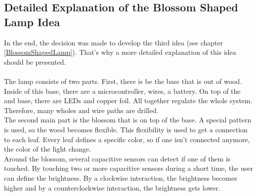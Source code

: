 \documentclass[04_projectProcess.tex]{subfiles}
\begin{document}
    \subsection{Detailed Explanation of the Blossom Shaped Lamp Idea}
        \begin{flushleft}
            In the end, the decision was made to develop the third idea (see chapter \ref{BlossomShapedLamp}). 
            That's why a more detailed explanation of this idea should be presented. \\~\\

            The lamp consists of two parts. First, there is be the base that is out of 
            wood. Inside of this base, there are a microcontroller, wires, a battery. On top 
            of the and base, there are LEDs and copper foil. All together regulate the whole 
            system. Therefore, many wholes and wire paths are drilled.\\

            The second main part is the blossom that is on top of the base. A special pattern 
            is used, so the wood becomes flexible. This flexibility is used to get a 
            connection to each leaf. Every leaf defines a specific color, so if one isn't 
            connected anymore, the color of the light change. \\

            Around the blossom, several capacitive sensors can detect if one of them is touched. 
            By touching two or more capacitive sensors during a short time, the user can 
            define the brightness. By a clockwise interaction, the brightness becomes higher and 
            by a counterclockwise interaction, the brightness gets lower. \\
        \end{flushleft}
\end{document}
